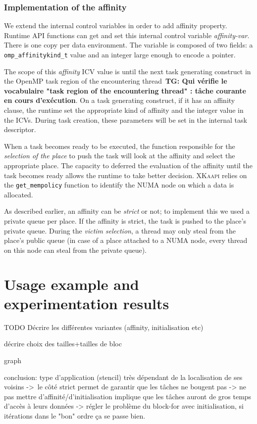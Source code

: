 \documentclass{Styles/llncs}
\newcommand{\kaapi}{\textsc{\mbox{XKaapi}}\xspace}
\newcommand{\TG}[1]{{\color{red}\bfseries TG: #1}}
\begin{document}
\subsubsection{Implementation of the affinity}
We extend the internal control variables in order to add affinity property. Runtime API functions can get and set this internal control variable \textit{affinity-var}. There is one copy per data environment. The variable is composed of two fields: a \texttt{omp\_affinitykind\_t} value and an integer large enough to encode a pointer.

The scope of this \textit{affinity} ICV value is until the next task generating construct in the OpenMP task region of the encountering thread~\cite{openmp40}\TG{Qui vérifie le vocabulaire "task region of the encountering thread" : tâche courante en cours d'exécution}. 
On a task generating construct, if it has an affinity clause, the runtime set the appropriate kind of affinity and the integer value in the ICVs.
During task creation, these parameters will be set in the internal task descriptor.

When a task becomes ready to be executed, the function responsible for the \textit{selection of the place} to push
the task will look at the affinity and select the appropriate place. The capacity to deferred the evaluation of the affinity until the task becomes ready allows the runtime to take better decision.
\kaapi relies on the \verb/get_mempolicy/ function to identify the NUMA node on which a data is allocated.

As described earlier, an affinity can be \emph{strict} or not; to implement this we used
a private queue per place. If the affinity is strict, the task is pushed to the place's private queue.
During the \textit{victim selection}, a thread may only steal from the place's
public queue (in case of a place attached to a  NUMA node, every thread on this node can steal from the private queue).

\section{Usage example and experimentation results}

TODO Décrire les différentes variantes
(affinity, initialisation etc)

décrire choix des tailles+tailles de bloc

graph

conclusion: type d'application (stencil) très dépendant de la localisation de ses voisins
-> le côté strict permet de garantir que les tâches ne bougent pas
-> ne pas mettre d'affinité/d'initialisation implique que les tâches auront de gros temps d'accès à leurs données
-> régler le problème du block-for avec initialisation, si itérations dans le "bon" ordre ça se passe bien.
\end{document}
